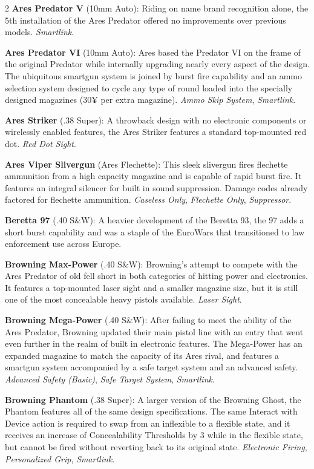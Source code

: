 \documentclass[
  oneside]{article}
\begin{document}
\begin{multicols}{2}
\textbf{Ares Predator V} (10mm Auto): Riding on
name brand recognition alone, the 5th installation
of the Ares Predator offered no improvements over
previous models. \emph{Smartlink}.

\textbf{Ares Predator VI} (10mm Auto): Ares based
the Predator VI on the frame of the original
Predator while internally upgrading nearly every
aspect of the design. The ubiquitous smartgun
system is joined by burst fire capability and an
ammo selection system designed to cycle any type
of round loaded into the specially designed
magazines (30¥ per extra magazine). \emph{Ammo
Skip System}, \emph{Smartlink}.

\textbf{Ares Striker} (.38 Super): A throwback
design with no electronic components or wirelessly
enabled features, the Ares Striker features a
standard top-mounted red dot. \emph{Red Dot
Sight}.

\textbf{Ares Viper Slivergun} (Ares Flechette):
This sleek slivergun fires flechette ammunition
from a high capacity magazine and is capable of
rapid burst fire. It features an integral silencer
for built in sound suppression. Damage codes
already factored for flechette ammunition.
\emph{Caseless Only}, \emph{Flechette Only},
\emph{Suppressor}.

\textbf{Beretta 97} (.40 S\&W): A heavier
development of the Beretta 93, the 97 adds a short
burst capability and was a staple of the EuroWars
that transitioned to law enforcement use across
Europe.

\textbf{Browning Max-Power} (.40 S\&W): Browning's
attempt to compete with the Ares Predator of old
fell short in both categories of hitting power and
electronics. It features a top-mounted laser sight
and a smaller magazine size, but it is still one
of the most concealable heavy pistols available.
\emph{Laser Sight}.

\textbf{Browning Mega-Power} (.40 S\&W): After
failing to meet the ability of the Ares Predator,
Browning updated their main pistol line with an
entry that went even further in the realm of built
in electronic features. The Mega-Power has an
expanded magazine to match the capacity of its
Ares rival, and features a smartgun system
accompanied by a safe target system and an
advanced safety. \emph{Advanced Safety (Basic)},
\emph{Safe Target System}, \emph{Smartlink}.

\textbf{Browning Phantom} (.38 Super): A larger
version of the Browning Ghost, the Phantom
features all of the same design specifications.
The same Interact with Device action is required
to swap from an inflexible to a flexible state,
and it receives an increase of Concealability
Thresholds by 3 while in the flexible state, but
cannot be fired without reverting back to its
original state. \emph{Electronic Firing},
\emph{Personalized Grip}, \emph{Smartlink}.


\end{multicols}
\end{document}
